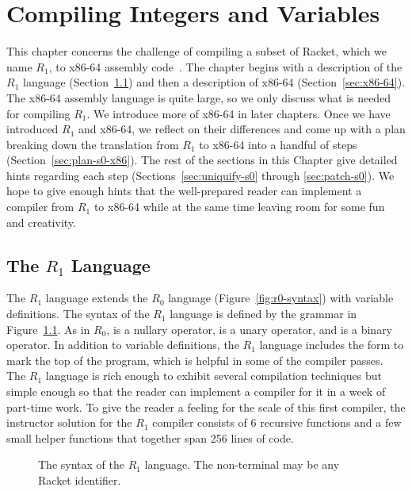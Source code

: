 \documentclass[11pt]{book}
\begin{document}
\chapter{Compiling Integers and Variables}
\label{ch:int-exp}

This chapter concerns the challenge of compiling a subset of Racket,
which we name $R_1$, to x86-64 assembly code~\citep{Intel:2015aa}. The
chapter begins with a description of the $R_1$ language
(Section~\ref{sec:s0}) and then a description of x86-64
(Section~\ref{sec:x86-64}). The x86-64 assembly language is quite
large, so we only discuss what is needed for compiling $R_1$. We
introduce more of x86-64 in later chapters. Once we have introduced
$R_1$ and x86-64, we reflect on their differences and come up with a
plan breaking down the translation from $R_1$ to x86-64 into a handful
of steps (Section~\ref{sec:plan-s0-x86}).  The rest of the sections in
this Chapter give detailed hints regarding each step
(Sections~\ref{sec:uniquify-s0} through \ref{sec:patch-s0}).  We hope
to give enough hints that the well-prepared reader can implement a
compiler from $R_1$ to x86-64 while at the same time leaving room for
some fun and creativity.

\section{The $R_1$ Language}
\label{sec:s0}

The $R_1$ language extends the $R_0$ language
(Figure~\ref{fig:r0-syntax}) with variable definitions.  The syntax of
the $R_1$ language is defined by the grammar in
Figure~\ref{fig:r1-syntax}. As in $R_0$,  is a nullary
operator, \key{-} is a unary operator, and \key{+} is a binary
operator. In addition to variable definitions, the $R_1$ language
includes the  form to mark the top of the program, which
is helpful in some of the compiler passes.  The $R_1$ language is rich
enough to exhibit several compilation techniques but simple enough so
that the reader can implement a compiler for it in a week of part-time
work.  To give the reader a feeling for the scale of this first
compiler, the instructor solution for the $R_1$ compiler consists of 6
recursive functions and a few small helper functions that together
span 256 lines of code.

\begin{figure}[btp]
\centering
{}
\caption{The syntax of the $R_1$ language. 
  The non-terminal \Var{} may be any Racket identifier.}
\label{fig:r1-syntax}
\end{figure}
\end{document}
